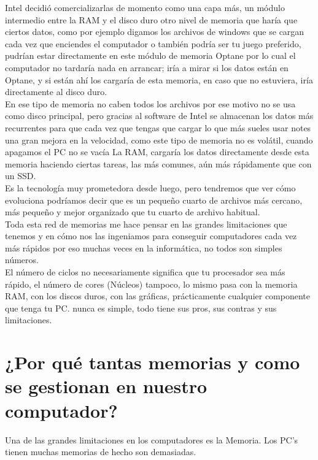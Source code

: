 \documentclass{article}
\begin{document}
Intel decidió comercializarlas de momento como una capa más, un módulo intermedio entre la RAM y el disco duro otro nivel de memoria que haría que ciertos datos, como por ejemplo digamos los archivos de windows que se cargan cada vez que enciendes el computador o también podría ser tu juego preferido, pudrían estar directamente en este módulo de memoria Optane por lo cual el computador no tardaría nada en arrancar; iría a mirar si los datos están en Optane, y si están ahí los cargaría de esta memoria, en caso que no estuviera, iría directamente al disco duro. \\

En ese tipo de memoria no caben todos los archivos por ese motivo no se usa como disco principal, pero gracias al software de Intel se almacenan los datos más recurrentes para que cada vez que tengas que cargar lo que más sueles usar notes una gran mejora en la velocidad, como este tipo de memoria no es volátil, cuando apagamos el PC no se vacía La RAM, cargaría los datos directamente desde esta memoria haciendo ciertas tareas, las más comunes, aún más rápidamente que con un SSD. \\

Es la tecnología muy prometedora desde luego, pero tendremos que ver cómo evoluciona podríamos decir que es un pequeño cuarto de archivos más cercano, más pequeño y mejor organizado que tu cuarto de archivo habitual.\\

Toda esta red de memorias me hace pensar en las grandes limitaciones que tenemos y en cómo nos las ingeniamos para conseguir computadores cada vez más rápidos por eso muchas veces en la informática, no todos son simples números.\\ 

El número de ciclos no necesariamente significa que tu procesador sea más rápido, el número de cores (Núcleos) tampoco, lo mismo pasa con la memoria RAM, con los discos duros, con las gráficas, prácticamente cualquier componente que tenga tu PC. nunca es simple, todo tiene sus pros, sus contras y sus limitaciones.\\


\section{¿Por qué tantas memorias y como se gestionan en nuestro computador?}
Una de las grandes limitaciones en los computadores es la Memoria. Los PC’s tienen muchas memorias de hecho son demasiadas. \\
\end{document}
